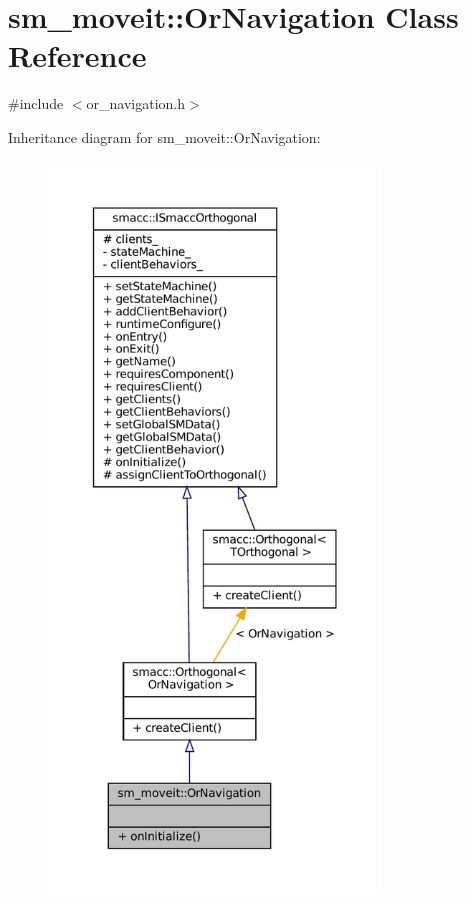 \hypertarget{classsm__moveit_1_1OrNavigation}{}\section{sm\+\_\+moveit\+:\+:Or\+Navigation Class Reference}
\label{classsm__moveit_1_1OrNavigation}


{\ttfamily \#include $<$or\+\_\+navigation.\+h$>$}



Inheritance diagram for sm\+\_\+moveit\+:\+:Or\+Navigation\+:
\nopagebreak
\begin{figure}[H]
\begin{center}
\leavevmode
\includegraphics[height=550pt]{classsm__moveit_1_1OrNavigation__inherit__graph}
\end{center}
\end{figure}


